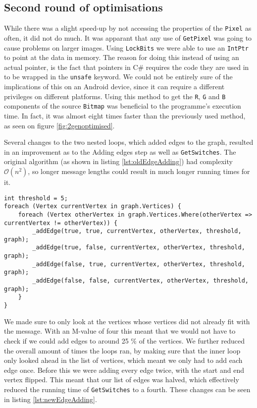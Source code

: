 \subsection{Second round of optimisations}
While there was a slight speed-up by not accessing the properties of the \lstinline|Pixel| as often, it did not do much.
It was apparant that any use of \lstinline|GetPixel| was going to cause problems on larger images.
Using \lstinline|LockBits| we were able to use an \lstinline|IntPtr| to point at the data in memory. \citep{MSDNIntPtr}
The reason for doing this instead of using an actual pointer, is the fact that pointers in C\# requires the code they are used in to be wrapped in the \lstinline|unsafe| keyword. 
We could not be entirely sure of the implications of this on an Android device, since it can require a different privileges on different platforms.
Using this method to get the \lstinline|R|, \lstinline|G| and \lstinline|B| components of the source \lstinline|Bitmap| was beneficial to the programme's execution time.
In fact, it was almost eight times faster than the previously used method, as seen on figure \ref{fig:2genoptimised}.

Several changes to the two nested loops, which added edges to the graph, resulted in an improvement as to the Adding edges step as well as \lstinline|GetSwitches|.
The original algorithm (as shown in listing \ref{lst:oldEdgeAdding}) had complexity $\mathcal{O}(n^2)$, so longer message lengths could result in much longer running times for it.

\begin{lstlisting}[firstnumber=459,label=lst:oldEdgeAdding, caption={Original algorithm for adding edges to the graph.}]
int threshold = 5;
foreach (Vertex currentVertex in graph.Vertices) {
    foreach (Vertex otherVertex in graph.Vertices.Where(otherVertex => currentVertex != otherVertex)) {
        _addEdge(true, true, currentVertex, otherVertex, threshold, graph);
        _addEdge(true, false, currentVertex, otherVertex, threshold, graph);
        _addEdge(false, true, currentVertex, otherVertex, threshold, graph);
        _addEdge(false, false, currentVertex, otherVertex, threshold, graph);
    }
}
\end{lstlisting}

We made sure to only look at the vertices whose vertices did not already fit with the message.
With an M-value of four this meant that we would not have to check if we could add edges to around 25 \% of the vertices.
We further reduced the overall amount of times the loops ran, by making sure that the inner loop only looked ahead in the list of vertices, which meant we only had to add each edge once.
Before this we were adding every edge twice, with the start and end vertex flipped.
This meant that our list of edges was halved, which effectively reduced the running time of \lstinline|GetSwitches| to a fourth.
These changes can be seen in listing \ref{lst:newEdgeAdding}.

